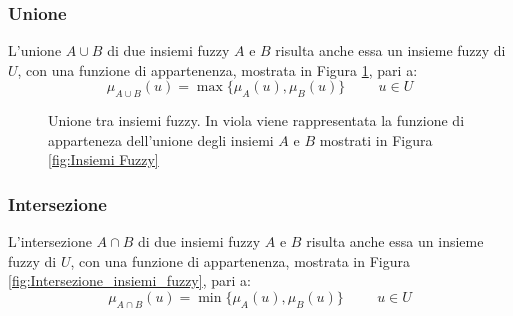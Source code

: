 \documentclass[a4paper,12pt]{report}
\begin{document}
\subsubsection{Unione}
L'unione $A \cup B$ di due insiemi fuzzy $A$ e $B$ risulta anche essa un insieme fuzzy di $U$, con una funzione di appartenenza, mostrata in Figura \ref{fig:Unione_Insiemi_Fuzzy}, pari a:
\begin{equation*}
    \mu_{A\cup B} (u) = \max\{\mu_A(u),\mu_B(u)\} \hspace{1cm}  u\in U
\end{equation*}

\begin{figure}[h]
    \centering
    \caption{Unione tra insiemi fuzzy. In viola viene rappresentata la funzione di apparteneza dell'unione degli insiemi $A$ e $B$ mostrati in Figura \ref{fig:Insiemi Fuzzy}}
    \label{fig:Unione_Insiemi_Fuzzy}   

\end{figure}

\subsubsection{Intersezione}
L'intersezione $A \cap B$ di due insiemi fuzzy $A$ e $B$ risulta anche essa un insieme fuzzy di $U$, con una funzione di appartenenza, mostrata in Figura \ref{fig:Intersezione_insiemi_fuzzy}, pari a:
\begin{equation*}
    \mu_{A \cap B} (u) = \min\{\mu_A(u),\mu_B(u)\} \hspace{1cm}  u\in U
\end{equation*}
\end{document}
